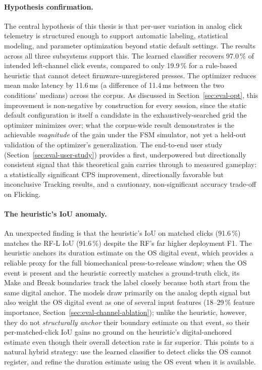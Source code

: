\paragraph{Hypothesis confirmation.}
The central hypothesis of this thesis is that per-user variation in analog click
telemetry is structured enough to support automatic labeling, statistical modeling,
and parameter optimization beyond static default settings.  The results across all
three subsystems support this.  The learned classifier recovers 97.0\,\% of intended
left-channel click events, compared to only 19.9\,\% for a rule-based heuristic
that cannot detect firmware-unregistered presses.  The optimizer reduces mean make
latency by 11.6\,ms (a difference of 11.4\,ms between the two conditions' medians)
across the corpus.  As discussed in Section~\ref{sec:eval-opt}, this improvement is
non-negative by construction for every session, since the static default
configuration is itself a candidate in the exhaustively-searched grid the optimizer
minimizes over; what the corpus-wide result demonstrates is the achievable
\emph{magnitude} of the gain under the FSM simulator, not yet a held-out validation
of the optimizer's generalization.
The end-to-end user study (Section~\ref{sec:eval-user-study}) provides a first,
underpowered but directionally consistent signal that this theoretical gain
carries through to measured gameplay: a statistically significant CPS improvement,
directionally favorable but inconclusive Tracking results, and a cautionary,
non-significant accuracy trade-off on Flicking.

\paragraph{The heuristic's IoU anomaly.}
An unexpected finding is that the heuristic's IoU on matched clicks (91.6\,\%) matches
the RF-L IoU (91.6\,\%) despite the RF's far higher deployment F1.  The heuristic
anchors its duration estimate on the OS digital event, which provides a reliable
proxy for the full biomechanical press-to-release window; when the OS event is
present and the heuristic correctly matches a ground-truth click, its Make and
Break boundaries track the label closely because both start from the same digital
anchor.  The models draw primarily on the analog depth signal but also weight
the OS digital event as one of several input features (18--29\,\% feature
importance, Section~\ref{sec:eval-channel-ablation}); unlike the heuristic,
however, they do not \emph{structurally anchor} their boundary estimate on
that event, so their per-matched-click IoU gains no ground on the heuristic's
digital-anchored estimate even though their overall detection rate is far
superior.  This points to a natural hybrid strategy:
use the learned classifier to detect clicks the OS cannot register, and refine the
duration estimate using the OS event when it is available.

